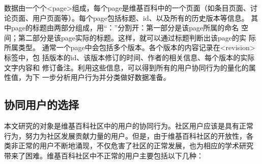 数据由一个个<page>组成，每个page是维基百科中的一个页面（如条目页面、讨
论页面、用户页面等）。每个page包括标题、id、以及所有的历史版本等信息。
其中page的标题由两部分组成，用“：”分割开：第一部分是该page所属的命名
空间；第二部分是该page实际的标题。这样，就可以通过标题判断出该page的实
际所属类型。
通常一个page中会包括多个版本。各个版本的内容记录在<revision>标签中，包
括版本的id、该版本修订的时间、作者的相关信息、每个版本的实际文字内容和
修订备注。利用这些信息，可以得到所有的用户协同行为的量化的属性值，为下
一步分析用户行为并分类做好数据准备。

\subsection{协同用户的选择}
\label{sec:user-exclude}

本文研究的对象是维基百科社区中的用户的协同行为。社区用户应该是具有正常
行为，努力为社区发展贡献力量的用户。但是，由于维基百科社区的开放性，各
类非正常的用户不断地涌现，不仅危害了社区的正常发展，也为相应的学术研究
带来了困难。维基百科社区中不正常的用户主要包括以下几种：
